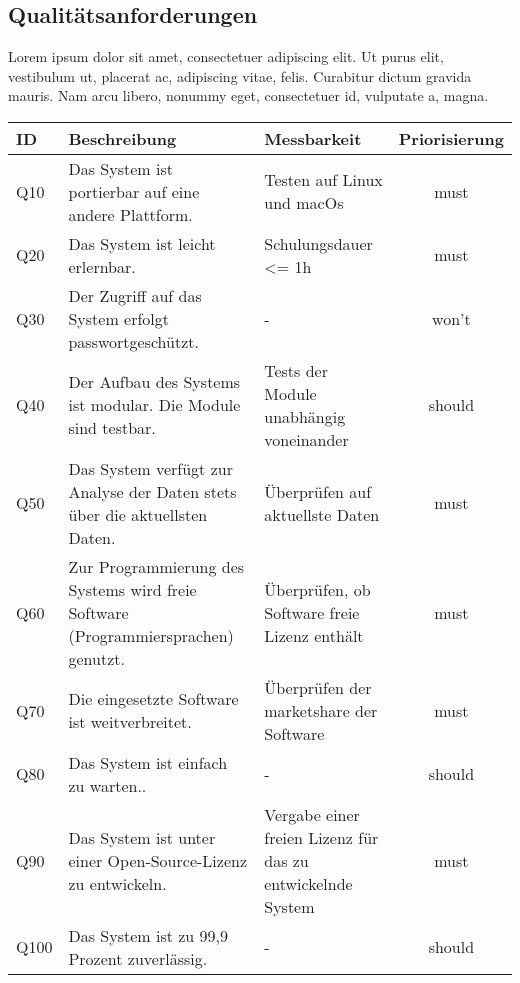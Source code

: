 \subsection{Qualitätsanforderungen}
Lorem ipsum dolor sit amet, consectetuer adipiscing elit. Ut purus elit, vestibulum ut, 
placerat ac, adipiscing vitae, felis. Curabitur dictum gravida mauris. Nam arcu libero, nonummy eget, consectetuer id, vulputate a, magna.
\begingroup
\setlength{\tabcolsep}{10pt} %
\renewcommand{\arraystretch}{1.25} 
\begin{table}[h]
    \centering
    \begin{adjustbox}{max width=\textwidth}
    \begin{tabular}{lp{6.5cm}p{6.5cm}c}
       \toprule
       \textbf{ID}          & \textbf{Beschreibung} & \textbf{Messbarkeit} & \textbf{Priorisierung}\\
       \midrule
        Q10                               &Das System ist portierbar auf eine andere Plattform. & Testen auf Linux und macOs & must\\
        Q20                               &Das System ist leicht erlernbar.& Schulungsdauer <= 1h  & must\\
        Q30                               &Der Zugriff auf das System erfolgt passwortgeschützt. & -  & won't\\
        Q40                               &Der Aufbau des Systems ist modular. Die Module sind testbar. & Tests der Module unabhängig voneinander & should\\
        Q50                               &Das System verfügt zur Analyse der Daten stets über die aktuellsten Daten. & Überprüfen auf aktuellste Daten & must\\
        Q60                               &Zur Programmierung des Systems wird freie Software (Programmiersprachen) genutzt. & Überprüfen, ob Software freie Lizenz enthält  & must\\
        Q70                               &Die eingesetzte Software ist weitverbreitet. & Überprüfen der marketshare der Software & must\\
        Q80                               &Das System ist einfach zu warten.. & - & should\\
        Q90                               &Das System ist unter einer Open-Source-Lizenz zu entwickeln. & Vergabe einer freien Lizenz für das zu entwickelnde System  & must\\
        Q100                              &Das System ist zu 99,9 Prozent zuverlässig.  &- & should\\

\end{tabular}
\end{adjustbox}
\end{table}
